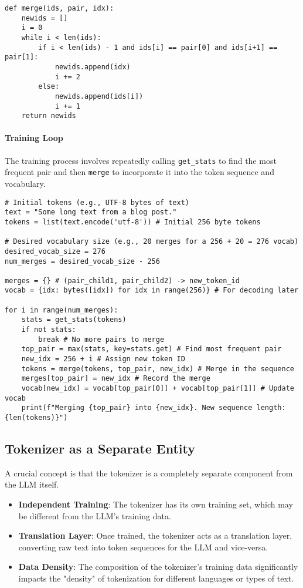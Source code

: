 \begin{lstlisting}[caption={Function to merge a pair}]
def merge(ids, pair, idx):
    newids = []
    i = 0
    while i < len(ids):
        if i < len(ids) - 1 and ids[i] == pair[0] and ids[i+1] == pair[1]:
            newids.append(idx)
            i += 2
        else:
            newids.append(ids[i])
            i += 1
    return newids
\end{lstlisting}

\paragraph{Training Loop}
The training process involves repeatedly calling \texttt{get\_stats} to find the most frequent pair and then \texttt{merge} to incorporate it into the token sequence and vocabulary.

\begin{lstlisting}[caption={BPE Training Loop (Conceptual)}]
# Initial tokens (e.g., UTF-8 bytes of text)
text = "Some long text from a blog post."
tokens = list(text.encode('utf-8')) # Initial 256 byte tokens

# Desired vocabulary size (e.g., 20 merges for a 256 + 20 = 276 vocab)
desired_vocab_size = 276
num_merges = desired_vocab_size - 256

merges = {} # (pair_child1, pair_child2) -> new_token_id
vocab = {idx: bytes([idx]) for idx in range(256)} # For decoding later

for i in range(num_merges):
    stats = get_stats(tokens)
    if not stats:
        break # No more pairs to merge
    top_pair = max(stats, key=stats.get) # Find most frequent pair
    new_idx = 256 + i # Assign new token ID
    tokens = merge(tokens, top_pair, new_idx) # Merge in the sequence
    merges[top_pair] = new_idx # Record the merge
    vocab[new_idx] = vocab[top_pair[0]] + vocab[top_pair[1]] # Update vocab
    print(f"Merging {top_pair} into {new_idx}. New sequence length: {len(tokens)}")
\end{lstlisting}

\subsection{Tokenizer as a Separate Entity}

A crucial concept is that the tokenizer is a completely separate component from the LLM itself.
\begin{itemize}
    \item \textbf{Independent Training}: The tokenizer has its own training set, which may be different from the LLM's training data.
    \item \textbf{Translation Layer}: Once trained, the tokenizer acts as a translation layer, converting raw text into token sequences for the LLM and vice-versa.
    \item \textbf{Data Density}: The composition of the tokenizer's training data significantly impacts the "density" of tokenization for different languages or types of text.
\end{itemize}

